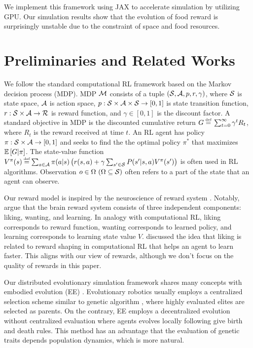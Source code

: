We implement this framework using JAX\citep{jax2018git} to accelerate simulation by utilizing GPU. Our simulation results show that the evolution of food reward is surprisingly unstable due to the constraint of space and food resources.

\section{Preliminaries and Related Works}\label{sec:related}
We follow the standard computational RL framework \citep{suttonReinforcementLearningIntroduction2018} based on the Markov decision process (MDP). MDP $\mathcal{M}{}$ consists of a tuple $(\mathcal{S}{}, \mathcal{A}{}, p, r, \gamma)$, where $\mathcal{S}{}$ is state space, $\mathcal{A}{}$ is action space, $p: \mathcal{S}\times\mathcal{A}\times \mathcal{S} \rightarrow [0, 1]$ is state transition function, $r: \mathcal{S}\times\mathcal{A} \rightarrow \mathcal{R}$ is reward function, and $\gamma \in [0, 1]$ is the discount factor. A standard objective in MDP is the discounted cumulative return $G \defequal{} \sum_{t=0}^{\infty}\gamma^t R_{t}$, where $R_t$ is the reward received at time $t$. An RL agent has policy $\pi: \mathcal{S} \times \mathcal{A} \rightarrow [0, 1]$ and seeks to find the the optimal policy $\pi^{*}$ that maximizes $\mathbb{E} \left[G|\pi\right]$. The state-value function $V^\pi(s) \defequal \sum_{a \in \A} \pi(a|s) \left( r(s, a) + \gamma \sum_{s' \in \X} P(s'|s, a) V^\pi(s') \right)$ is often used in RL algorithms. Observation $o \in \Omega~(\Omega \subseteq \mathcal{S})$ often refers to a part of the state that an agent can observe.

Our reward model is inspired by the neuroscience of reward system \citep{schultzNeuronalRewardDecision2015, berridgePleasureSystemsBrain2015}. Notably, \citet{berridgeDissectingComponentsReward2009} argue that the brain reward system consists of three independent components: liking, wanting, and learning. In analogy with computational RL, liking corresponds to reward function, wanting corresponds to learned policy, and learning corresponds to learning state value $V$. \citet{dayanLikingEarlyEditable2022} discussed the idea that liking is related to reward shaping \citep{ngPolicyInvarianceReward1999} in computational RL that helps an agent to learn faster. This aligns with our view of rewards, although we don't focus on the quality of rewards in this paper.

Our distributed evolutionary simulation framework shares many concepts with embodied evolution (EE) \citep{watsonEmbodiedEvolutionDistributing2002,bredecheEmbodiedEvolutionCollective2018}. Evolutionary robotics \citep{nolfiEvolutionaryRoboticsBiology2004} usually employs a centralized selection scheme similar to genetic algorithm \citep{mitchellIntroductionGeneticAlgorithms1998}, where highly evaluated elites are selected as parents. On the contrary, EE employs a decentralized evolution without centralized evaluation where agents evolves locally following give birth and death rules. This method has an advantage that the evaluation of genetic traits depends population dynamics, which is more natural.

